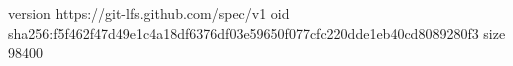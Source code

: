 version https://git-lfs.github.com/spec/v1
oid sha256:f5f462f47d49e1c4a18df6376df03e59650f077cfc220dde1eb40cd8089280f3
size 98400
